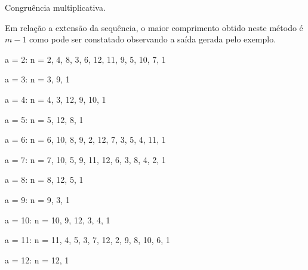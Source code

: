 \documentclass[a4paper,12pt,oneside,onecolumn]{uerj/uerj}
\begin{document}
\begin{algorithm}[!ht]
    \caption{Congruência multiplicativa.} \label{alg:congmult}
    \begin{pseudocode}
      \Documentacao
        \Algoritmo{}
                \Parar
              \Senao
              \FimSe
            \FimPara
          \FimPara
        \FimAlgoritmo
      \FimDocumentacao
    \end{pseudocode}
\end{algorithm}

Em relação a extensão da sequência, o maior comprimento obtido neste método é $m-1$ como pode ser constatado observando a saída gerada pelo exemplo.

\begin{lcircp}
    \item a =  2: n = {  2,  4,  8,  3,  6, 12, 11,  9,  5, 10,  7,  1 }
    \item a =  3: n = {  3,  9,  1 }
    \item a =  4: n = {  4,  3, 12,  9, 10,  1 }
    \item a =  5: n = {  5, 12,  8,  1 }
    \item a =  6: n = {  6, 10,  8,  9,  2, 12,  7,  3,  5,  4, 11,  1 }
    \item a =  7: n = {  7, 10,  5,  9, 11, 12,  6,  3,  8,  4,  2,  1 }
    \item a =  8: n = {  8, 12,  5,  1 }
    \item a =  9: n = {  9,  3,  1 }
    \item a = 10: n = { 10,  9, 12,  3,  4,  1 }
    \item a = 11: n = { 11,  4,  5,  3,  7, 12,  2,  9,  8, 10,  6,  1 }
    \item a = 12: n = { 12,  1 }\\
\end{lcircp}
\end{document}
